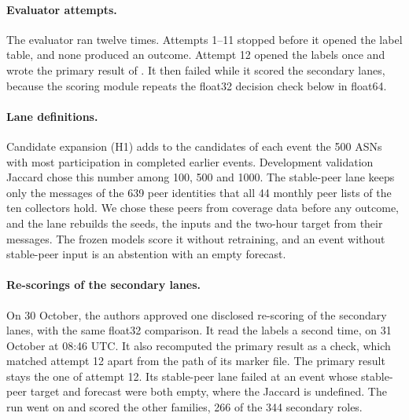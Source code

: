 \paragraph{Evaluator attempts.}
The evaluator ran twelve times.
Attempts 1--11 stopped before it opened the label table, and none produced an outcome.
Attempt 12 opened the labels once and wrote the primary result of .
It then failed while it scored the secondary lanes, because the scoring module repeats the float32 decision check below in float64.

\paragraph{Lane definitions.}
Candidate expansion (H1) adds to the candidates of each event the 500 ASNs with most participation in completed earlier events.
Development validation Jaccard chose this number among 100, 500 and \num{1000}.
The stable-peer lane keeps only the messages of the 639 peer identities that all 44 monthly peer lists of the ten collectors hold.
We chose these peers from coverage data before any outcome, and the lane rebuilds the seeds, the inputs and the two-hour target from their messages.
The frozen models score it without retraining, and an event without stable-peer input is an abstention with an empty forecast.

\paragraph{Re-scorings of the secondary lanes.}
On 30 October, the authors approved one disclosed re-scoring of the secondary lanes, with the same float32 comparison.
It read the labels a second time, on 31 October at 08:46 UTC.
It also recomputed the primary result as a check, which matched attempt 12 apart from the path of its marker file.
The primary result stays the one of attempt 12.
Its stable-peer lane failed at an event whose stable-peer target and forecast were both empty, where the Jaccard is undefined.
The run went on and scored the other families, 266 of the 344 secondary roles.

